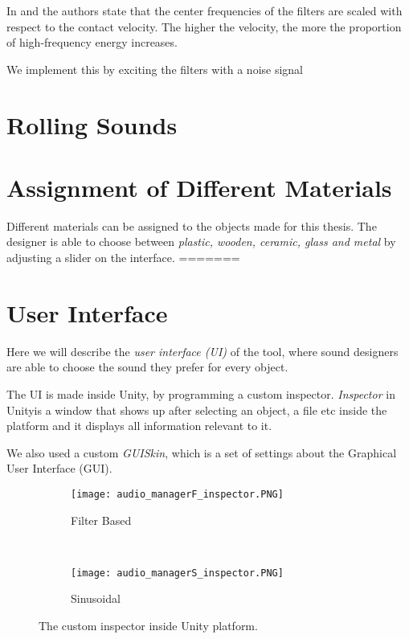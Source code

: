 In \cite{gaver1993we} and \cite{van2001foleyautomatic} the authors state that the center frequencies of the filters are scaled with respect to the contact velocity. The higher the velocity, the more the proportion of high-frequency energy increases. 

We implement this by exciting the filters with a noise signal
\section{Rolling Sounds}

\section{Assignment of Different Materials}
Different materials can be assigned to the objects made for this thesis. The designer is able to choose between \textit{plastic, wooden, ceramic, glass and metal} by adjusting a slider on the interface. 
=======
\section{User Interface}
Here we will describe the \textit{user interface (UI)} of the tool, where sound designers are able to choose the sound they prefer for every object.

The UI is made inside Unity\textregistered, by programming a custom inspector. \textit{Inspector} in Unity\textregistered is a window that shows up after selecting an object, a file etc inside the platform and it displays all information relevant to it.

We also used a custom \textit{GUISkin}, which is a set of settings about the Graphical User Interface (GUI). 

\begin{figure}[H]
    \centering
    \begin{subfigure}[b]{0.4\textwidth}
        \texttt{[image: audio\_managerF\_inspector.PNG]}
        \caption{Filter Based}
        \label{fig:FB}
    \end{subfigure}
    ~ %
    \begin{subfigure}[b]{0.4\textwidth}
        \texttt{[image: audio\_managerS\_inspector.PNG]}
        \caption{Sinusoidal}
        \label{fig:sin}
    \end{subfigure}
    \caption{The custom inspector inside Unity platform.}\label{fig:custom_insp}
\end{figure}

